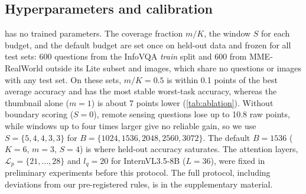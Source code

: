\subsection{Hyperparameters and calibration}
\label{sec:impl}

\method has no trained parameters. The coverage fraction $m/K$, the window $S$ for each budget, and the default
budget are set once on held-out data and frozen for all test sets: 600 questions from the InfoVQA \emph{train}
split and 600 from MME-RealWorld outside its Lite subset and images, which share no questions or images with any
test set. On these sets, $m/K=0.5$ is within 0.1 points of the best average accuracy and has the most stable
worst-task accuracy, whereas the thumbnail alone ($m=1$) is about 7 points lower (\cref{tab:ablation}). Without
boundary scoring ($S=0$), remote sensing questions lose up to 10.8 raw points, while windows up to four times
larger give no reliable gain, so we use $S=\{5,4,4,3,3\}$ for $B=\{1024,1536,2048,2560,3072\}$. The default
$B=1536$ ($K=6$, $m=3$, $S=4$) is where held-out accuracy saturates. The attention layers,
$\mathcal{L}_p=\{21,\dots,28\}$ and $l_q=20$ for InternVL3.5-8B ($L=36$), were fixed in preliminary experiments
before this protocol. The full protocol, including deviations from our pre-registered rules, is in the
supplementary material.

